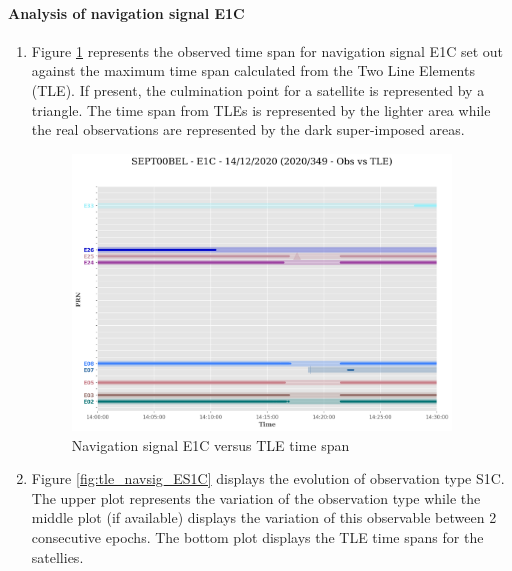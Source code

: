 \paragraph{Analysis of navigation signal E1C}%
\label{para:AnalysisofnavigationsignalE1C}%
\newpage%
\begin{enumerate}%
\item%
Figure \ref{fig:tle_navsig_1CE} represents the observed time span for navigation signal E1C set out against the maximum time span calculated from the  Two Line Elements (TLE). If present, the culmination point for a satellite is represented by a triangle. The time span from TLEs is represented by the lighter area while the real observations are represented by the dark super-imposed areas.%


\begin{figure}[H]%
\centering%
\includegraphics[width=0.95\textwidth]{png/SEPT00BEL_R_20203491400_30M_01S_MO_E-E1C-TLE-arcs.png}%
\caption{\label{fig:tle_navsig_1CE} Navigation signal E1C versus TLE time span}%
\end{figure}

%
\item%
Figure \ref{fig:tle_navsig_ES1C} displays the evolution of observation type S1C. \newline The upper plot represents the variation of the observation type while the middle plot (if available) displays the variation of this observable between 2 consecutive epochs. The bottom plot displays the TLE time spans for the satellies.%



\end{enumerate}
